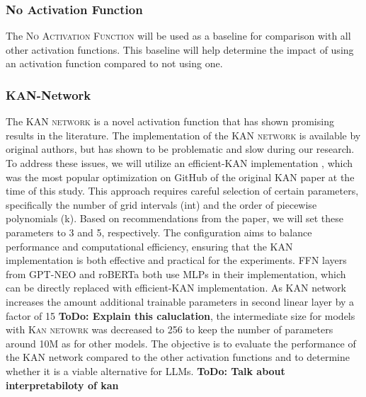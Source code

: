 


\subsubsection{No Activation Function}
The \textsc{No Activation Function} will be used as a baseline for comparison with all other activation functions. This baseline will help determine the impact of using an activation function compared to not using one.

\subsubsection{KAN-Network}
The \textsc{KAN network} is a novel activation function that has shown promising results in the literature. The implementation of the \textsc{KAN network} is available by original authors, but has shown to be problematic and slow during our research. To address these issues, we will utilize an efficient-KAN implementation \cite{efficient-kan}, which was the most popular optimization on GitHub of the original KAN paper at the time of this study. This approach requires careful selection of certain parameters, specifically the number of grid intervals (int) and the order of piecewise polynomials (k). Based on recommendations from the paper, we will set these parameters to 3 and 5, respectively. The configuration aims to balance performance and computational efficiency, ensuring that the KAN implementation is both effective and practical for the experiments. FFN layers from GPT-NEO and roBERTa both use MLPs in their implementation, which can be directly replaced with efficient-KAN implementation. As KAN network increases the amount additional trainable parameters in second linear layer by a factor of 15 \textbf{ToDo: Explain this caluclation}, the intermediate size for models with \textsc{Kan netowrk} was decreased to 256 to keep the number of parameters around 10M as for other models. The objective is to evaluate the performance of the KAN network compared to the other activation functions and to determine whether it is a viable alternative for LLMs. \textbf{ToDo: Talk about interpretabiloty of kan}